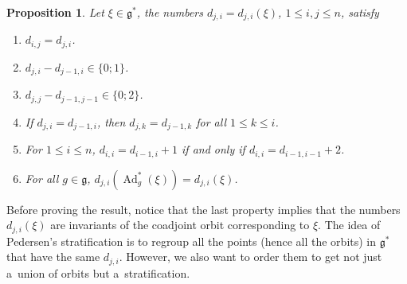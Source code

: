 \documentclass[10pt,a4paper]{article}
\newcommand{\Ad}{\operatorname{Ad}} %
\newcommand{\g}{\mathfrak{g}} %
\numberwithin{equation}{section}
\newtheorem{prop}[thm]{Proposition}
\theoremstyle{definition}
\begin{document}
\begin{prop}
 Let $\xi \in \g^*$, the numbers $d_{j,i} = d_{j,i}(\xi)$, $1\leq i,j\leq n$, satisfy
 \begin{enumerate}\itemsep=0pt
 \item[$(1)$] $d_{i,j} = d_{j,i}$.
 \item[$(2)$] $d_{j,i} - d_{j-1,i} \in \{0;1\}$.
 \item[$(3)$] $d_{j,j} - d_{j-1,j-1} \in \{0;2\}$.
 \item[$(4)$] If $d_{j,i} = d_{j-1,i}$, then $d_{j,k} = d_{j-1,k}$ for all $1\leq k \leq i$.
 \item[$(5)$] For $1\leq i \leq n$, $d_{i,i} = d_{i-1,i}+1$ if and only if $d_{i,i} = d_{i-1,i-1}+2$.
 \item[$(6)$] For all $g \in \g$, $d_{j,i}(\Ad^*_g(\xi)) = d_{j,i}(\xi)$.
 \end{enumerate}
\end{prop}

Before proving the result, notice that the last property implies that the numbers $d_{j,i}(\xi)$ are invariants of the coadjoint orbit corresponding to $\xi$. The idea of Pedersen's stratification is to regroup all the points (hence all the orbits) in $\g^*$ that have the same $d_{j,i}$. However, we also want to order them to get not just a~union of orbits but a~stratification.
\end{document}
